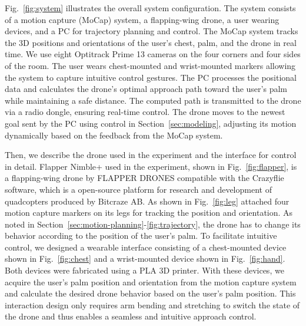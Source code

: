 Fig.~\ref{fig:system} illustrates the overall system configuration.
The system consists of a motion capture (MoCap) system, a flapping-wing drone, a user wearing devices, and a PC for trajectory planning and control.
The MoCap system tracks the 3D positions and orientations of the user's chest, palm, and the drone in real time.
We use eight Optitrack Prime 13 cameras on the four corners and four sides of the room.  
The user wears chest-mounted and wrist-mounted markers allowing the system to capture intuitive control gestures. 
The PC processes the positional data and calculates the drone's optimal approach path toward the user's palm while maintaining a safe distance. 
The computed path is transmitted to the drone via a radio dongle, ensuring real-time control. 
The drone moves to the newest goal sent by the PC using control in Section~\ref{sec:modeling}, 
adjusting its motion dynamically based on the feedback from the MoCap system.

Then, we describe the drone used in the experiment and the interface for control in detail.
Flapper Nimble+ used in the experiment, shown in Fig.~\ref{fig:flapper}, is a flapping-wing drone by FLAPPER DRONES compatible with the Crazyflie software, 
which is a open-source platform for research and development of quadcopters produced by Bitcraze AB. 
As shown in Fig.~\ref{fig:leg} attached four motion capture markers on its legs for tracking the position and orientation. 
As noted in Section~\ref{sec:motion-planning}-\ref{fig:trajectory}, the drone has to change its behavior according to the position of the user's palm.
To facilitate intuitive control, we designed a wearable interface consisting of 
a chest-mounted device shown in Fig.~\ref{fig:chest} and 
a wrist-mounted device shown in Fig.~\ref{fig:hand}.
Both devices were fabricated using a PLA 3D printer. 
With these devices, we acquire the user's palm position and orientation from the motion capture system and calculate the desired drone behavior based on the user's palm position. 
This interaction design only requires arm bending and stretching to switch the state of the drone and thus enables a seamless and intuitive approach control.
